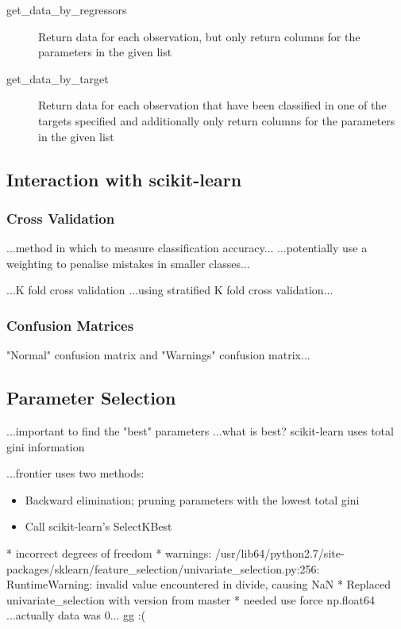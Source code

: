 \begin{description}
    \item[get\_data\_by\_regressors] Return data for each observation, but only
        return columns for the parameters in the given list
    \item[get\_data\_by\_target] Return data for each observation that have been
        classified in one of the targets specified and additionally only
        return columns for the parameters in the given list
\end{description}

\subsection{Interaction with scikit-learn}
\subsubsection{Cross Validation}

...method in which to measure classification accuracy...
...potentially use a weighting to penalise mistakes in smaller classes...

...K fold cross validation
...using stratified K fold cross validation...

\subsubsection{Confusion Matrices}
"Normal" confusion matrix and "Warnings" confusion matrix...

\subsection{Parameter Selection}
...important to find the "best" parameters
...what is best? scikit-learn uses total gini information

...frontier uses two methods:
\begin{itemize}
    \item Backward elimination; pruning parameters with the lowest total gini
    \item Call scikit-learn's SelectKBest
\end{itemize}


* incorrect degrees of freedom
* warnings: /usr/lib64/python2.7/site-packages/sklearn/feature\_selection/univariate\_selection.py:256: RuntimeWarning: invalid value encountered in divide, causing NaN
* Replaced univariate\_selection with version from master
* needed use force np.float64
...actually data was 0... gg :(

